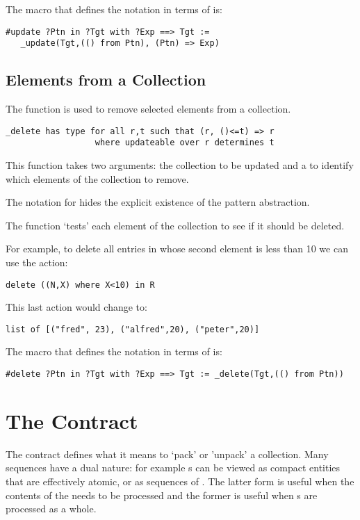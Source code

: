 The macro that defines the  notation in terms of  is:
\begin{lstlisting}
#update ?Ptn in ?Tgt with ?Exp ==> Tgt := 
   _update(Tgt,(() from Ptn), (Ptn) => Exp)
\end{lstlisting}


\subsection{ Elements from a Collection}
\label{delete}
The  function is used to remove selected elements from a collection.
\begin{lstlisting}
_delete has type for all r,t such that (r, ()<=t) => r
                  where updateable over r determines t
\end{lstlisting}
This function takes two arguments: the collection to be updated and a  to identify which elements of the collection to remove.

\begin{aside}
The  notation for  hides the explicit existence of the pattern abstraction.
\end{aside}

The  function `tests' each element of the collection to see if it should be deleted.

For example, to delete all entries in   whose second element is less than 10 we can use the action:
\begin{lstlisting}
delete ((N,X) where X<10) in R
\end{lstlisting}
This last action would change  to:
\begin{lstlisting}
list of [("fred", 23), ("alfred",20), ("peter",20)]
\end{lstlisting}

The macro that defines the  notation in terms of  is:
\begin{lstlisting}
#delete ?Ptn in ?Tgt with ?Exp ==> Tgt := _delete(Tgt,(() from Ptn))
\end{lstlisting}


\section{The  Contract}
\label{explosionContract}
The  contract defines what it means to `pack' or 'unpack' a collection. Many sequences have a dual nature: for example s can be viewed as compact entities that are effectively atomic, or as sequences of . The latter form is useful when the contents of the  needs to be processed and the former is useful when s are processed as a whole.


